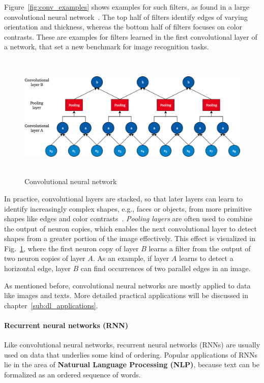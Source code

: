 Figure~\ref{fig:conv_examples} shows examples for such filters, as found in
a large convolutional neural network~\cite{Krizhevsky2012}.
The top half of filters identify edges of varying orientation and thickness,
whereas the bottom half of filters focuses on color contrasts.
These are examples for filters learned in the first convolutional layer of a
network, that set a new benchmark for image recognition tasks.

\begin{figure}[h]
  \centering
  \includegraphics[height=6cm]{img/conv_architecture}
  \caption{Convolutional neural network}
\label{fig:cnn_architecture}
\end{figure}

In practice, convolutional layers are stacked, so that later layers can learn
to identify increasingly complex shapes, e.g., faces or objects, from more
primitive shapes like edges and color contrasts~\cite{Simonyan2015}.
\textit{Pooling layers} are often used to combine the output of neuron copies, which
enables the next convolutional layer to detect shapes from a greater portion of
the image effectively.
This effect is visualized in Fig.~\ref{fig:cnn_architecture}, where the first
neuron copy of layer $B$ learns a filter from the output of two neuron copies
of layer $A$.
As an example, if layer $A$ learns to detect a horizontal edge, layer $B$ can
find occurrences of two parallel edges in an image.

As mentioned before, convolutional neural networks are mostly applied to data
like images and texts.
More detailed practical applications will be discussed in chapter~\ref{sub:dl_applications}.

\paragraph{Recurrent neural networks (RNN)}

Like convolutional neural networks, recurrent neural networks (RNNs) are usually
used on data that underlies some kind of ordering.
Popular applications of RNNs lie in the  area of \textbf{Naturual Language
Processing (NLP)}, because text can be formalized as an ordered sequence of
words.


